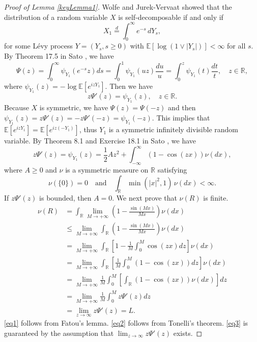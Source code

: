 \documentclass[12pt]{amsart}
\begin{document}
\begin{proof}[Proof of Lemma \ref{keyLemma1}]
Wolfe \cite{Wol82} and Jurek-Vervaat \cite{JV83} showed that the distribution of a random variable $X$ is self-decomposable if and only if
\[
X_1 \stackrel{d}{=} \int_0^\infty e^{-s} \, dY_s, \tag{2}
\]
for some L\'evy process $Y=(Y_s, s\ge 0)$ with $\mathbb{E}[\log(1\vee |Y_s|)]<\infty$ for all $s$.
By Theorem 17.5 in Sato \cite{Sat99}, we have 
\begin{equation}
    \Psi(z) =  \int_0^\infty \psi_{Y_1}(e^{-s}z)ds = \int_0^1 \psi_{Y_1}(uz) \frac{du}{u} = \int_0^z \psi_{Y_1}(t) \frac{dt}{t}, \quad z \in \mathbb{R},
\end{equation}
where $\psi_{Y_1}(z) = - \log \mathbb{E}[e^{izY_1}]$. Then we have 
\begin{equation}
   z \Psi'(z) =   \psi_{Y_1}(z), \quad z \in \mathbb{R}.
\end{equation}
Because $X$ is symmetric, we have $\Psi(z) = \Psi(-z)$ and then $\psi_{Y_1}(z) = z \Psi'(z) = -z \Psi'(-z) =\psi_{Y_1}(-z)$. This implies that $\mathbb{E}[e^{izY_1}] = \mathbb{E}[e^{iz(-Y_1)}]$, thus $Y_1$ is a symmetric infinitely divisible random variable. By Theorem 8.1 and Exercise 18.1 in Sato \cite{Sat99}, we have 
\begin{equation}
    \label{LK of Y}
     z\Psi'(z) = \psi_{Y_1}(z) = \frac{1}{2}Az^2 + \int_{-\infty}^{\infty} (1-\cos (zx))\nu(dx),
\end{equation}
where $A \geq 0$ and $\nu$ is a symmetric measure on $\mathbb{R}$ satisfying 
$$\nu(\{0\}) = 0 \quad \text{and} \quad \int_{\mathbb{R}} \min (|x|^2, 1) \, \nu(dx) < \infty. $$
If $z\Psi'(z)$ is bounded, then $A = 0$. We next prove that $\nu(R)$ is finite. 
\begin{align}
    \nu(R) & = \int_\mathbb{R}  \lim_{M \rightarrow +\infty} (1 - \frac{\sin(Mx)}{Mx})  \nu(dx)  \\
    \label{eq1}
    &\leq \lim_{M \rightarrow +\infty}  \int_\mathbb{R} (1 - \frac{\sin(Mx)}{Mx})  \nu(dx)  \\
    & = \lim_{M \rightarrow +\infty}  \int_\mathbb{R} \left[1 - \frac{1}{M} \int_0^M\cos(zx)dz\right]  \nu(dx) \\
    & = \lim_{M \rightarrow +\infty}  \int_\mathbb{R} \left[ \frac{1}{M} \int_0^M (1-\cos(zx))dz\right]  \nu(dx)  \\
    \label{eq2}
    &= \lim_{M \rightarrow +\infty} \frac{1}{M} \int_0^M \left[  \int_\mathbb{R} (1-\cos(zx)) \nu(dx) \right] dz  \\
    &= \lim_{M \rightarrow +\infty} \frac{1}{M} \int_0^M  z \Psi'(z) dz \\
    \label{eq3}
    & = \lim_{z \rightarrow  \infty} z\Psi'(z) = L.
\end{align}
\eqref{eq1} follows from Fatou's lemma. \eqref{eq2} follows from Tonelli's theorem. \eqref{eq3} is guaranteed by the assumption that $\lim_{z \rightarrow  \infty} z\Psi'(z)$ exists. 




\end{proof}
\end{document}
